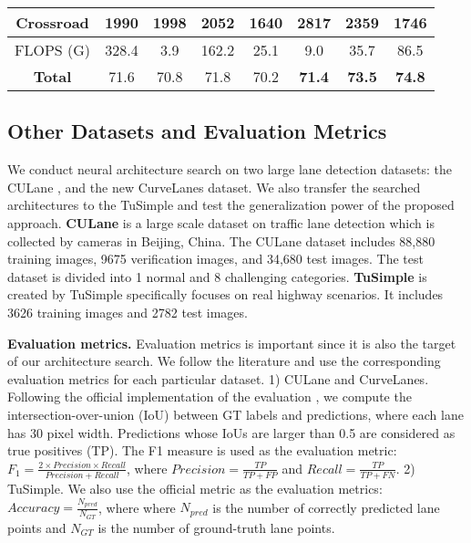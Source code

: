 \documentclass[runningheads]{llncs}
\providecommand{\tabularnewline}{\\}
\begin{document}
\begin{table}[tb]
\begin{centering}
\begin{tabular}{c|cccc|ccc}
{\scriptsize{}Crossroad} & {\scriptsize{}1990} & {\scriptsize{}1998} & {\scriptsize{}2052} & {\scriptsize{}1640} & {\scriptsize{}2817} & {\scriptsize{}2359} & {\scriptsize{}1746}\tabularnewline
\hline 
{\scriptsize{}FLOPS (G)} & {\scriptsize{}328.4} & {\scriptsize{}3.9} & {\scriptsize{}162.2} & {\scriptsize{}25.1} & {\scriptsize{}9.0} & {\scriptsize{}35.7} & {\scriptsize{}86.5}\tabularnewline
\hline 
\textbf{\scriptsize{}Total} & {\scriptsize{}71.6} & {\scriptsize{}70.8} & {\scriptsize{}71.8} & {\scriptsize{}70.2} & \textbf{\scriptsize{}71.4} & \textbf{\scriptsize{}73.5} & \textbf{\scriptsize{}74.8}\tabularnewline
\hline 
\end{tabular}{\scriptsize\par}
\par\end{centering}

\end{table}


\subsection{Other Datasets and Evaluation Metrics}

We conduct neural architecture search on two large lane detection
datasets: the CULane \cite{pan2018spatial}, and the new CurveLanes
dataset. We also transfer the searched architectures to the TuSimple
\cite{TuSimple} and test the generalization power of the proposed
approach.\textbf{ CULane} \cite{pan2018spatial} is a large scale
dataset on traffic lane detection which is collected by cameras in
Beijing, China. The CULane dataset includes 88,880 training images,
9675 verification images, and 34,680 test images. The test dataset
is divided into 1 normal and 8 challenging categories.\textbf{ TuSimple
}\cite{TuSimple} is created by TuSimple specifically focuses on real
highway scenarios. It includes 3626 training images and 2782 test
images. 

\textbf{Evaluation metrics.} Evaluation metrics is important since
it is also the target of our architecture search. We follow the literature
\cite{pan2018spatial} and use the corresponding evaluation metrics
for each particular dataset. 1) CULane and CurveLanes. Following the
official implementation of the evaluation \cite{pan2018spatial},
we compute the intersection-over-union (IoU) between GT labels and
predictions, where each lane has 30 pixel width. Predictions whose
IoUs are larger than 0.5 are considered as true positives (TP). The
F1 measure is used as the evaluation metric: $F_{1}=\frac{2\times Precision\times Recall}{Precision+Recall}$,
where $Precision=\frac{TP}{TP+FP}$ and $Recall=\frac{TP}{TP+FN}$.
2) TuSimple. We also use the official metric as the evaluation metrics:
$Accuracy=\frac{N_{pred}}{N_{GT}}$, where where $N_{pred}$ is the
number of correctly predicted lane points and $N_{GT}$ is the number
of ground-truth lane points.
\end{document}
